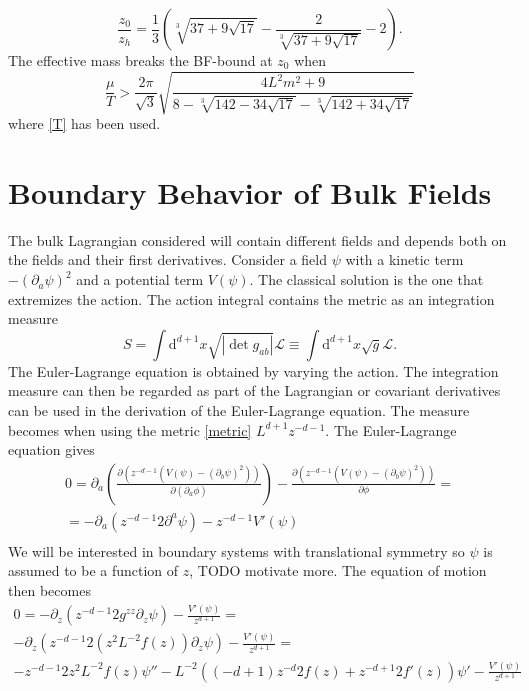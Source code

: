 \documentclass[12pt]{report}
\renewcommand{\d}{\ensuremath{\mathrm{d}}}
\renewcommand{\L}{\ensuremath{\mathcal{L}}}
\newcommand{\At}{\ensuremath{{\phi}}}
\begin{document}
\begin{equation}
\frac{z_0}{z_h}=\frac{1}{3} \left(\sqrt[3]{37+9 \sqrt{17}}-\frac{2}{\sqrt[3]{37+9 \sqrt{17}}}-2\right).
\end{equation}
The effective mass breaks the BF-bound at $z_0$ when
\begin{equation}
 \frac{\mu}{T}>
\frac{2\pi }{\sqrt{3}} \sqrt{\frac{4 L^2 m^2+9}{8-\sqrt[3]{142-34
   \sqrt{17}}-\sqrt[3]{142+34 \sqrt{17}}}}
\end{equation}
where \eqref{T} has been used.

\section{Boundary Behavior of Bulk Fields}
The bulk Lagrangian considered will contain different fields and depends both on the fields and their first derivatives. Consider a field $\psi$ with a kinetic term $-(\partial_a\psi)^2$ and a potential term $V(\psi)$. The classical solution is the one that extremizes the action. The action integral contains the metric as an integration measure
\begin{equation}
 S=\int\d^{d+1} x\sqrt{|\det g_{ab}|}\L\equiv\int\d^{d+1} x\sqrt{g}\L.
\end{equation}
The Euler-Lagrange equation is obtained by varying the action. The integration measure can then be regarded as part of the Lagrangian or covariant derivatives can be used in the derivation of the Euler-Lagrange equation. The measure becomes when using the metric \eqref{metric} $L^{d+1}z^{-d-1}$. The Euler-Lagrange equation gives
\begin{equation}
\begin{split}
 0=\partial_a\left(\frac{\partial (z^{-d-1}(V(\psi)-(\partial_b\psi)^2)) }{\partial(\partial_a\At)}\right)-\frac{\partial  (z^{-d-1}(V(\psi)-(\partial_b\psi)^2) )}{\partial\At}=\\
 =-\partial_a\left(z^{-d-1}2\partial^a\psi\right)-z^{-d-1}V'(\psi)\\
\end{split}
\end{equation}
We will be interested in boundary systems with translational symmetry so $\psi$ is assumed to be a function of $z$, TODO motivate more. The equation of motion then becomes
\begin{equation}
\begin{split}
0=-\partial_z\left(z^{-d-1}2g^{zz}\partial_z\psi\right)  -\frac{V'(\psi)}{z^{d+1}}=\\
-\partial_z\left(z^{-d-1}2(z^2L^{-2}f(z))\partial_z\psi\right)  -\frac{V'(\psi)}{z^{d+1}}=\\
-z^{-d-1}2z^2L^{-2}f(z)\psi''-L^{-2}\left((-d+1)z^{-d}2f(z) + z^{-d+1}2f'(z)\right)\psi' -\frac{V'(\psi)}{z^{d+1}}
\end{split}
\end{equation}
\end{document}
